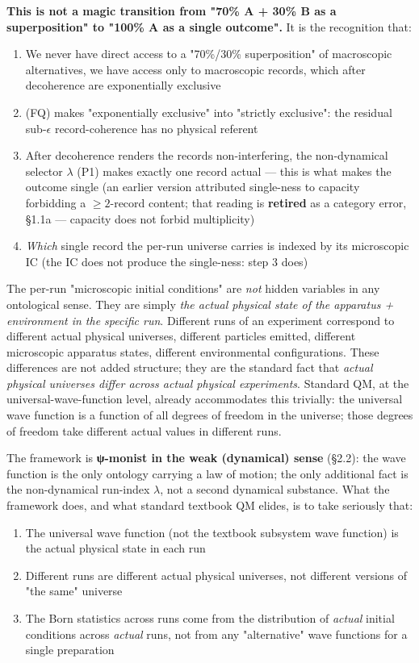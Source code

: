 \documentclass[11pt,a4paper]{article}
\begin{document}
\textbf{This is not a magic transition from "70\% A + 30\% B as a superposition" to "100\% A as a single outcome".} It is the recognition that:
\begin{enumerate}
  \item We never have direct access to a "70\%/30\% superposition" of macroscopic alternatives, we have access only to macroscopic records, which after decoherence are exponentially exclusive
  \item (FQ) makes "exponentially exclusive" into "strictly exclusive": the residual sub-$\epsilon$ record-coherence has no physical referent
  \item After decoherence renders the records non-interfering, the non-dynamical selector $\lambda$ (P1) makes exactly one record actual — this is what makes the outcome single (an earlier version attributed single-ness to capacity forbidding a $\ge 2$-record content; that reading is \textbf{retired} as a category error, §1.1a — capacity does not forbid multiplicity)
  \item \emph{Which} single record the per-run universe carries is indexed by its microscopic IC (the IC does not produce the single-ness: step 3 does)
\end{enumerate}

The per-run "microscopic initial conditions" are \emph{not} hidden variables in any ontological sense. They are simply \emph{the actual physical state of the apparatus + environment in the specific run}. Different runs of an experiment correspond to different actual physical universes, different particles emitted, different microscopic apparatus states, different environmental configurations. These differences are not added structure; they are the standard fact that \emph{actual physical universes differ across actual physical experiments}. Standard QM, at the universal-wave-function level, already accommodates this trivially: the universal wave function is a function of all degrees of freedom in the universe; those degrees of freedom take different actual values in different runs.

The framework is \textbf{ψ-monist in the weak (dynamical) sense} (§2.2): the wave function is the only ontology carrying a law of motion; the only additional fact is the non-dynamical run-index $\lambda$, not a second dynamical substance. What the framework does, and what standard textbook QM elides, is to take seriously that:
\begin{enumerate}
  \item The universal wave function (not the textbook subsystem wave function) is the actual physical state in each run
  \item Different runs are different actual physical universes, not different versions of "the same" universe
  \item The Born statistics across runs come from the distribution of \emph{actual} initial conditions across \emph{actual} runs, not from any "alternative" wave functions for a single preparation
\end{enumerate}
\end{document}
